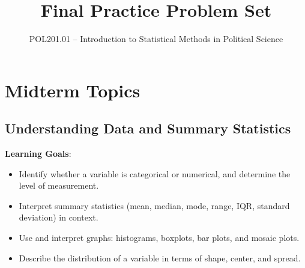 \documentclass{article}
\title{Final Practice Problem Set}
\author{POL201.01 -- Introduction to Statistical Methods in Political Science}
\date{}
\begin{document}
\maketitle

\section{Midterm Topics}


\subsection{Understanding Data and Summary Statistics}
\textbf{Learning Goals}:
\begin{itemize}
    \item Identify whether a variable is categorical or numerical, and determine the level of measurement.
    \item Interpret summary statistics (mean, median, mode, range, IQR, standard deviation) in context.
    \item Use and interpret graphs: histograms, boxplots, bar plots, and mosaic plots.
    \item Describe the distribution of a variable in terms of shape, center, and spread.
\end{itemize}
\end{document}
